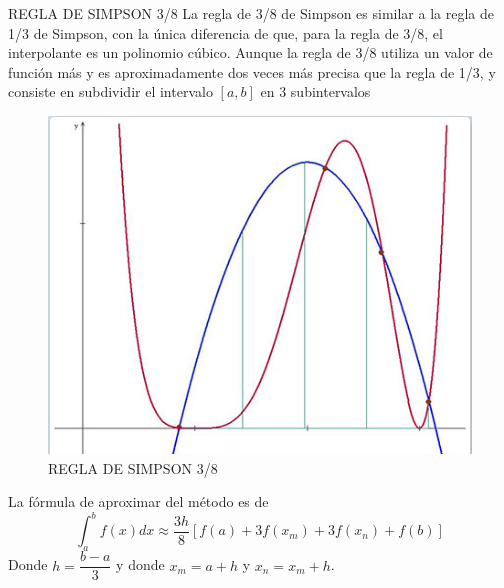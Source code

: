 \documentclass[11pt]{beamer}
\begin{document}
		\begin{frame}{REGLA DE SIMPSON 3/8}
			La regla de 3/8 de Simpson es similar a la regla de 1/3 de Simpson, con la única diferencia 
			de que, para la regla de 3/8, el interpolante es un polinomio cúbico. Aunque la regla de 3/8 
			utiliza un valor de función más y es aproximadamente dos veces más precisa que la regla de 
			1/3, y consiste en subdividir el intervalo $[a,b]$ en 3 subintervalos
			\begin{figure}[H]
				\centering
				\includegraphics[scale=0.32]{12.png}
				\caption{REGLA DE SIMPSON 3/8}
				\centering
			\end{figure}

		\end{frame}
		
		\begin{frame}
			La fórmula de aproximar del método es de 
			$$\int_{a}^{b} f(x)dx \approx \dfrac{3h}{8}[f(a) + 3f(x_m) + 3f(x_n) + f(b)]$$
			Donde $h = \dfrac{b-a}{3}$ y donde $x_m = a+h $ y $x_n = x_m+h$. 
		\end{frame}
		
\end{document}
